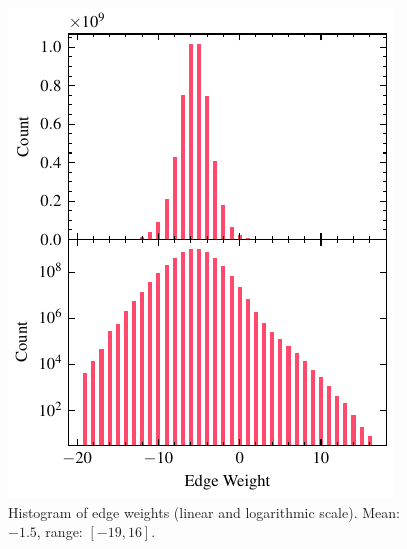 \begin{figure}[H]
    \centering
    \includegraphics[width=\linewidth]{assets/edge_weights.pdf}
    \caption{Histogram of edge weights (linear and logarithmic scale). Mean: $-1.5$, range: $[-19, 16]$.}
    \label{fig:hist}
\end{figure}



